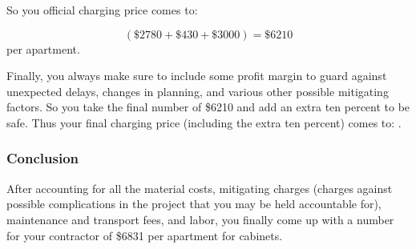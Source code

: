 \documentclass{ximera}
\begin{document}
    So you official charging price comes to:
    
    \[
        (\$2780 + \$430 + \$ 3000) = \$6210
    \]
    per apartment.
    
    Finally, you always make sure to include some profit margin to guard against unexpected delays, changes in planning, and various other possible mitigating factors. So you take the final number of \$6210 and add an extra ten percent to be safe. Thus your final charging price (including the extra ten percent) comes to: .

\subsubsection*{Conclusion}

    After accounting for all the material costs, mitigating charges (charges against possible complications in the project that you may be held accountable for), maintenance and transport fees, and labor, you finally come up with a number for your contractor of \$6831 per apartment for cabinets.
\end{document}
